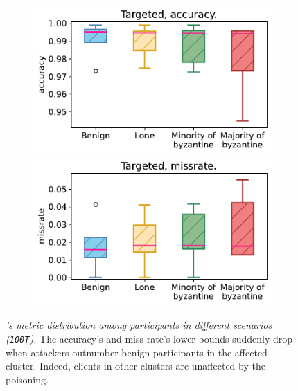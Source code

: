 \begin{figure}
  \begin{subfigure}[t]{1.0\linewidth}
    \centering 
    \includegraphics[width=0.4\linewidth]{figures/poisoning/trusfids_targeted_acc_all_distibutions.pdf} 
    \qquad   
    \includegraphics[width=0.4\linewidth]{figures/poisoning/trusfids_targeted_missrate_all_distibutions.pdf}   
\end{subfigure}
  \caption{
    \emph{\thecontrib's metric distribution among participants in different scenarios (\texttt{100T}).}
    The accuracy's and miss rate's lower bounds suddenly drop when attackers outnumber benign participants in the affected cluster.
    Indeed, clients in other clusters are unaffected by the poisoning.
  }
  \label{fig:trustfids_accuracy_missrate_distribution}
  
\end{figure}


